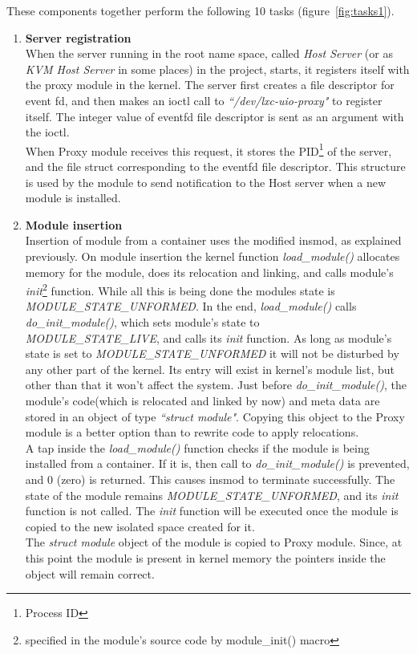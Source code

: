 \documentclass[twoside]{iitbreport}
\begin{document}
These components together perform the following 10 tasks (figure~\ref{fig:tasks1}).

\begin{enumerate}
\item \textbf{Server registration}\\
When the server running in the root name space, called \textit{Host Server} (or as \textit{KVM Host Server} in some places) in the project, starts, it registers itself with the proxy module in the kernel.
The server first creates a file descriptor for event fd, and then makes an ioctl call to \textit{``/dev/lxc-uio-proxy"} to register itself. The integer value of eventfd file descriptor is sent as an argument with the ioctl.\\
When Proxy module receives this request, it stores the PID\footnote{Process ID} of the server, and the file struct corresponding to the eventfd file descriptor. This structure is used by the module to send notification to the Host server when a new module is installed.

\item \textbf{Module insertion}\\
Insertion of module from a container uses the modified insmod, as explained previously. On module insertion the kernel function \textit{load\_module()} allocates memory for the module, does its relocation and linking, and calls module's \textit{init}\footnote{specified in the module's source code by module\_init() macro} function. While all this is being done the modules state is \textit{MODULE\_STATE\_UNFORMED}. In the end, \textit{load\_module()} calls \textit{do\_init\_module()}, which sets module's state to\\ 
\textit{MODULE\_STATE\_LIVE}, and calls its \textit{init} function. As long as module's state is set to \textit{MODULE\_STATE\_UNFORMED} it will not be disturbed by any other part of the kernel. Its entry will exist in kernel's module list, but other than that it won't affect the system. Just before \textit{do\_init\_module()}, the module's code(which is relocated and linked by now) and meta data are stored in an object of type \textit{``struct module"}. Copying this object to the Proxy module is a better option than to rewrite code to apply relocations.\\
A tap inside the \textit{load\_module()} function checks if the module is being installed from a container. If it is, then call to \textit{do\_init\_module()} is prevented, and 0 (zero) is returned. This causes insmod to terminate successfully. The state of the module remains \textit{MODULE\_STATE\_UNFORMED}, and its \textit{init} function is not called. The \textit{init} function will be executed once the module is copied to the new isolated space created for it.
\\
The \textit{struct module} object of the module is copied to Proxy module. Since, at this point the module is present in kernel memory the pointers inside the object will remain correct.


\end{enumerate}
\end{document}
